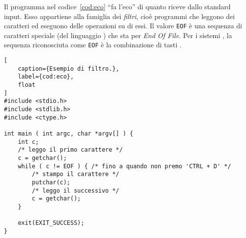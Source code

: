 Il programma nel codice~\ref{cod:eco} ``fa l'eco'' di quanto riceve dallo standard input.
Esso appartiene alla famiglia dei \emph{filtri}, cioè programmi che leggono dei caratteri ed eseguono delle operazioni su di essi.
Il valore \lstinline!EOF! è una sequenza di caratteri speciale (del linguaggio ) che sta per \emph{End Of File}.
Per i sistemi , la sequenza riconosciuta come \lstinline!EOF! è la combinazione di tasti . 
\begin{lstlisting}[
	caption={Esempio di filtro.},
	label={cod:eco},
	float
]
#include <stdio.h>
#include <stdlib.h>
#include <ctype.h>

int main ( int argc, char *argv[] ) {
	int c;
	/* leggo il primo carattere */
	c = getchar();
	while ( c != EOF ) { /* fino a quando non premo 'CTRL + D' */
		/* stampo il carattere */
		putchar(c);
		/* leggo il successivo */
		c = getchar();
	}

	exit(EXIT_SUCCESS);
}
\end{lstlisting}